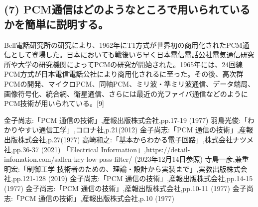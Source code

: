 \documentclass[
  a4paper,
  11pt,
]{ltjsarticle}
\begin{document}
\subsection{(7) PCM通信はどのようなところで用いられているかを簡単に説明する。}
Bell電話研究所の研究により、1962年にT1方式が世界初の商用化されたPCM通信として登場した。日本においても戦後いち早く日本電信電話公社電気通信研究所や大学の研究機関によってPCMの研究が開始された。1965年には、24回線PCM方式が日本電信電話公社により商用化されるに至った。その後、高次群PCMの開発、マイクロPCM、同軸PCM、ミリ波・準ミリ波通信、データ端局、画像符号化、統合網、衛星通信、さらには最近の光ファイバ通信などのようにPCM技術が用いられている。[9]

\begin{thebibliography}{99}
     金子尚志:「PCM 通信の技術」,産報出版株式会社,pp.17-19 (1977)
     羽鳥光俊:「わかりやすい通信工学」,コロナ社,p.21(2012)
     金子尚志:「PCM 通信の技術」,産報出版株式会社,p.27(1977)
     高崎和之:「基本からわかる電子回路」,株式会社ナツメ社,pp.36-37 (2021)
     「Electrical Information」,https://detail-infomation.com/sallen-key-low-pass-filter/ (2023年12月14日参照)
     寺島一彦,兼重明宏:「制御工学 技術者のための、理論・設計から実装まで」,実教出版株式会社,pp.121-128 (2019)
     金子尚志:「PCM 通信の技術」,産報出版株式会社,pp.14-15 (1977)
     金子尚志:「PCM 通信の技術」,産報出版株式会社,pp.10-11 (1977)
     金子尚志:「PCM 通信の技術」,産報出版株式会社,p.10 (1977)
\end{thebibliography}
\end{document}
